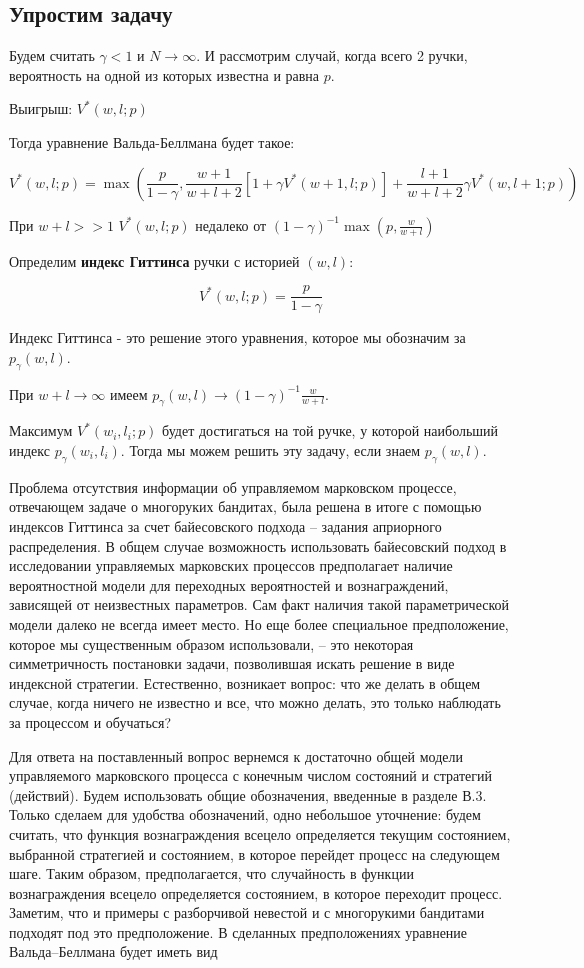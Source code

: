 \documentclass[a4paper]{article}
\begin{document}
\subsection*{Упростим задачу}

Будем считать $\gamma < 1$ и $N \rightarrow \infty$. И рассмотрим случай, когда всего 2 ручки, вероятность на одной из которых известна и равна $p$.

Выигрыш: $V^*(w,l;p)$

Тогда уравнение Вальда-Беллмана будет такое:

\[ V^*(w,l;p) = \max \left( \frac{p}{1-\gamma} , \frac{w+1}{w+l+2} [1+\gamma V^*(w+1,l;p)] + \frac{l+1}{w+l+2}\gamma V^*(w,l+1;p) \right) \]

При $w+l>>1$ $V^*(w,l;p)$ недалеко от $(1-\gamma)^{-1} \max \left( p, \frac{w}{w+l} \right)$

Определим \textbf{индекс Гиттинса} ручки с историей $(w, l)$:

\[ V^*(w,l;p) = \frac{p}{1-\gamma} \]

Индекс Гиттинса - это решение этого уравнения, которое мы обозначим за $p_\gamma(w,l)$.

При $w+l \rightarrow \infty$ имеем $p_\gamma(w,l) \rightarrow (1-\gamma)^{-1} \frac{w}{w+l}$.

Максимум $V^*(w_i,l_i;p)$ будет достигаться на той ручке, у которой наибольший индекс $p_\gamma(w_i,l_i)$. Тогда мы можем решить эту задачу, если знаем $p_\gamma(w,l)$.

Проблема отсутствия информации об управляемом марковском процессе, отвечающем задаче о многоруких бандитах, была решена в итоге с помощью индексов Гиттинса за счет
байесовского подхода – задания априорного распределения. В общем
случае возможность использовать байесовский подход в исследовании управляемых марковских процессов предполагает наличие вероятностной модели для переходных вероятностей и вознаграждений,
зависящей от неизвестных параметров. Сам факт наличия такой параметрической модели далеко не всегда имеет место. Но еще более
специальное предположение, которое мы существенным образом использовали, – это некоторая симметричность постановки задачи, позволившая искать решение в виде индексной стратегии. Естественно,
возникает вопрос: что же делать в общем случае, когда ничего не известно и все, что можно делать, это только наблюдать за процессом и
обучаться?

Для ответа на поставленный вопрос вернемся к достаточно общей
модели управляемого марковского процесса с конечным числом состояний и стратегий (действий). Будем использовать общие обозначения,
введенные в разделе В.3. Только сделаем для удобства обозначений,
одно небольшое уточнение: будем считать, что функция вознаграждения всецело определяется текущим состоянием, выбранной стратегией
и состоянием, в которое перейдет процесс на следующем шаге. Таким
образом, предполагается, что случайность в функции вознаграждения
всецело определяется состоянием, в которое переходит процесс. Заметим, что и примеры с разборчивой невестой и с многорукими бандитами подходят под это предположение. В сделанных предположениях
уравнение Вальда–Беллмана будет иметь вид
\end{document}
